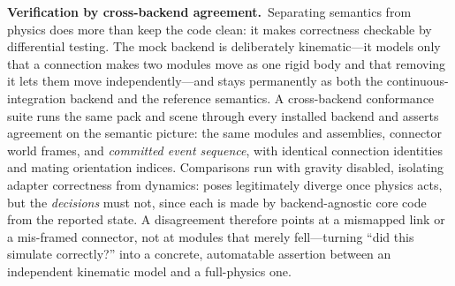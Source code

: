 \noindent\textbf{Verification by cross-backend agreement.}\ Separating semantics from physics does more than keep the code clean: it makes
correctness checkable by differential testing. The mock backend is deliberately kinematic---it models
only that a connection makes two modules move as one rigid body and that removing
it lets them move independently---and stays permanently as both the
continuous-integration backend and the reference semantics. A cross-backend
conformance suite runs the same pack and scene through every installed backend
and asserts agreement on the semantic picture: the same modules and assemblies,
connector world frames, and \emph{committed event sequence}, with identical
connection identities and mating orientation indices. Comparisons run with
gravity disabled, isolating adapter correctness from dynamics: poses legitimately
diverge once physics acts, but the \emph{decisions} must not, since each is made
by backend-agnostic core code from the reported state. A disagreement therefore
points at a mismapped link or a mis-framed connector, not at modules that merely
fell---turning ``did this simulate correctly?'' into a concrete, automatable
assertion between an independent kinematic model and a full-physics one.
